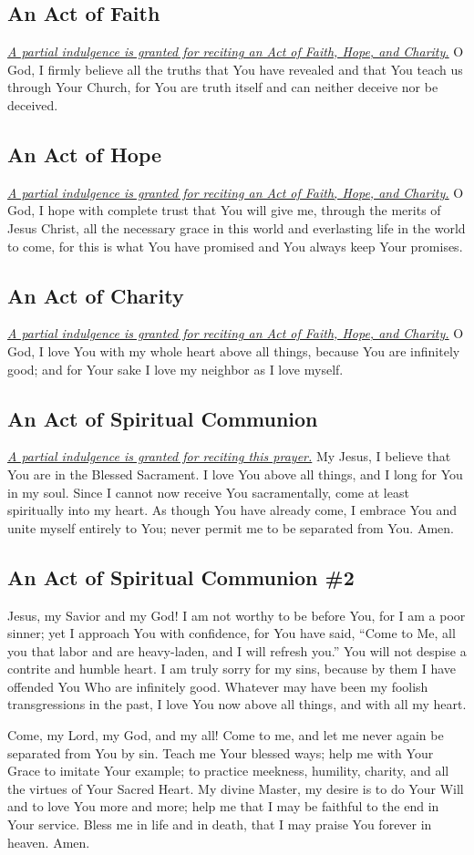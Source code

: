 \documentclass[12pt]{article}
\newcommand{\prayertitle}[1]{\subsection{#1}}
\newcommand{\indulgencedprayertitle}[1]{\prayertitle{#1 \protect\kreuz}}
\newcommand{\emphasis}[1]{\emph{#1}}
\newcommand{\emphasis}[1]{\textsl{#1}}
\newcommand{\note}[1]{{\small{\emphasis{#1}}}\newline}
\newcommand{\linkednote}[2]{\hyperlink{#1}{\note{#2}}}
\begin{document}
\indulgencedprayertitle{An Act of Faith}
\label{prayer:act_of_faith}
\linkednote{grant28}{A partial indulgence is granted for reciting an Act of Faith, Hope, and Charity.}
O God,
I firmly believe all the truths that You have revealed and that You teach us through Your Church, for You are truth itself and can neither deceive nor be deceived.

\indulgencedprayertitle{An Act of Hope}
\linkednote{grant28}{A partial indulgence is granted for reciting an Act of Faith, Hope, and Charity.}
O God,
I hope with complete trust that You will give me, through the merits of Jesus Christ, all the necessary grace in this world and everlasting life in the world to come, for this is what You have promised and You always keep Your promises.

\indulgencedprayertitle{An Act of Charity}
\linkednote{grant28}{A partial indulgence is granted for reciting an Act of Faith, Hope, and Charity.}
O God,
I love You with my whole heart above all things, because You are infinitely good; and for Your sake I love my neighbor as I love myself.

\indulgencedprayertitle{An Act of Spiritual Communion}
\linkednote{grant8}{A partial indulgence is granted for reciting this prayer.}
My Jesus, I believe that You are in the Blessed Sacrament.
I love You above all things, and I long for You in my soul.
Since I cannot now receive You sacramentally, come at least spiritually into my heart.
As though You have already come, I embrace You and unite myself entirely to You;
never permit me to be separated from You.
Amen.

\prayertitle{An Act of Spiritual Communion \#2}
Jesus, my Savior and my God!
I am not worthy to be before You, for I am a poor sinner;
yet I approach You with confidence, for You have said, ``Come to Me, all you that labor and are heavy-laden, and I will refresh you.''
You will not despise a contrite and humble heart.
I am truly sorry for my sins, because by them I have offended You Who are infinitely good.
Whatever may have been my foolish transgressions in the past, I love You now above all things, and with all my heart.

Come, my Lord, my God, and my all!
Come to me, and let me never again be separated from You by sin.
Teach me Your blessed ways;
help me with Your Grace to imitate Your example;
to practice meekness, humility, charity, and all the virtues of Your Sacred Heart.
My divine Master, my desire is to do Your Will and to love You more and more;
help me that I may be faithful to the end in Your service.
Bless me in life and in death, that I may praise You forever in heaven.
Amen.
\end{document}
